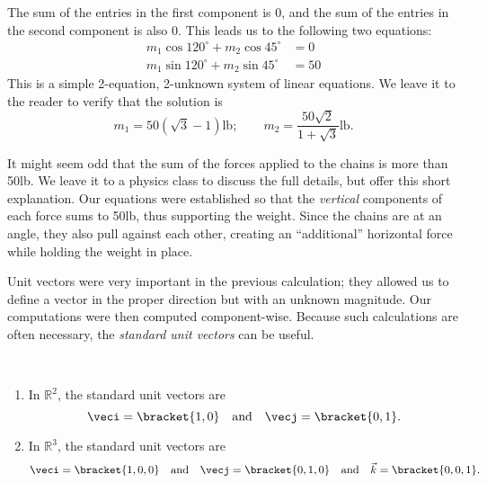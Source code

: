 \begin{example}
The sum of the entries in the first component is 0, and the sum of the entries in the second component is also 0. This leads us to the following two equations:
\begin{align*}
m_1\cos120^\circ + m_2\cos45^\circ &=0 \\
m_1\sin120^\circ + m_2\sin45^\circ &=50
\end{align*}
This is a simple 2-equation, 2-unknown system of linear equations. We leave it to the reader to verify that the solution is 
\[
m_1=50(\sqrt{3}-1)\text{lb}%
;\qquad
m_2=\frac{50\sqrt{2}}{1+\sqrt{3}}\text{lb}.%
\]

It might seem odd that the sum of the forces applied to the chains is more than 50lb. We leave it to a physics class to discuss the full details, but offer this short explanation. Our equations were established so that the \emph{vertical} components of each force sums to 50lb, thus supporting the weight. Since the chains are at an angle, they also pull against each other, creating an ``additional'' horizontal force while holding the weight in place.
\end{example}

Unit vectors were very important in the previous calculation; they allowed us to define a vector in the proper direction but with an unknown magnitude. Our computations were then computed component-wise. Because such calculations are often necessary, the \emph{standard unit vectors} can be useful.

\begin{definition}\label{def:standard_unit}
%
\mbox{}\\[-2\baselineskip]\begin{enumerate}
	\item In $\mathbb{R}^2$, the standard unit vectors are
	\[\veci =\bracket{1,0}\quad \text{and}\quad \vecj =\bracket{0,1}.\]
	\item In $\mathbb{R}^3$, the standard unit vectors are
	\[\veci =\bracket{1,0,0}\quad \text{and}\quad \vecj =\bracket{0,1,0}\quad \text{and}\quad \vec k =\bracket{0,0,1}.\]
\end{enumerate}
\end{definition}

